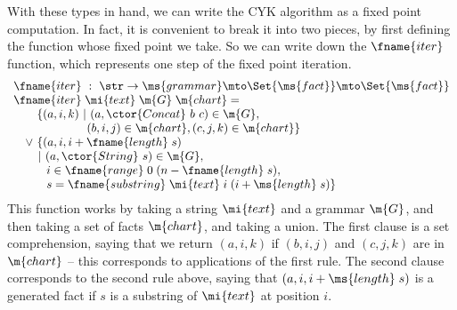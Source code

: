 With these types in hand, we can write the CYK algorithm as a fixed
point computation. In fact, it is convenient to break it into two
pieces, by first defining the function whose fixed point we take. So
we can write down the $\fname{iter}$ function, which represents one step of
the fixed point iteration.
\[\begin{array}{l}
\fname{iter} ~:~ \str \uto \ms{grammar} \mto \Set{\ms{fact}} \mto \Set{\ms{fact}}\\
\fname{iter} \;\mi{text} \;\m{G} \;\m{chart} =\\
\hspace{1em}\phantom{\vee~}
\{(a,i,k) ~|~ (a, \ctor{Concat}~b~c) \in \m{G},\\
\hspace{6.25em} (b,i,j) \in \m{chart}, (c,j,k) \in \m{chart}\}\\
\hspace{1em}\vee~ \{(a,i,i+\fname{length}\;s)\\
\hspace{2.1em}|~ (a, \ctor{String}~s) \in \m{G},\\
\hspace{2.2em}\phantom{|~} i \in \fname{range}\;0\;(n-\fname{length}\;s),\\
\hspace{2.2em}\phantom{|~}
s = \fname{substring} \;\mi{text} \;i \;(i+\ms{length}\;s)\}
\end{array}\]
This function works by taking a string $\mi{text}$ and a grammar $\m{G}$, and
then taking a set of facts $\m{chart}$, and taking a union. The first clause is
a set comprehension, saying that we return $(a, i, k)$ if $(b, i, j)$ and $(c,
j, k)$ are in $\m{chart}$ -- this corresponds to applications of the first rule.
The second clause corresponds to the second rule above, saying that $(a, i, i +
\ms{length}\;s)$ is a generated fact if $s$ is a substring of $\mi{text}$ at
position $i$.

